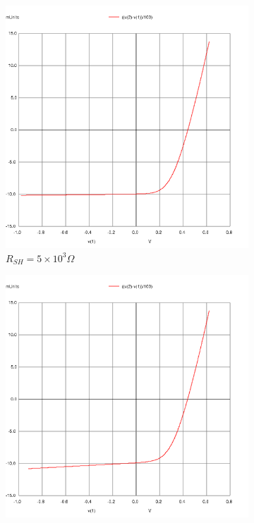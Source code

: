 \documentclass[12pt]{article}
\begin{document}
\begin{figure}[H]
\centering
	\begin{subfigure}[b]{0.45\linewidth}
		\includegraphics[width = \linewidth, trim = {0 0 0 0}, clip]{part3_rsh5e3.png}
		\caption{\( R_{SH} = 5 \times 10^3 \Omega\)}
	\end{subfigure} 
	\begin{subfigure}[b]{0.45\linewidth}
		\includegraphics[width = \linewidth, trim = {0 0 0 0}, clip]{part3_rsh1e3.png}

\end{subfigure}
\end{figure}
\end{document}
